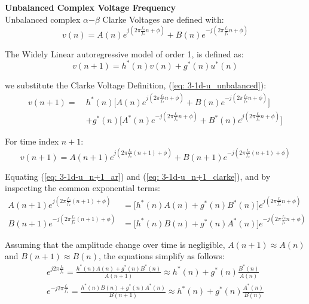 \documentclass[12pt]{article}
\numberwithin{equation}{section}
\begin{document}
			\noindent
			\textbf{Unbalanced Complex Voltage Frequency} \\
			Unbalanced complex $\alpha$$-$$\beta$ Clarke Voltages are defined with:
			\vspace*{-0.5\baselineskip}
			\begin{equation}
			v(n) = A(n) e^{j(2\pi \frac{f_{o}}{f_{s}} n + \phi)} + B(n) e^{-j(2\pi \frac{f_{o}}{f_{s}} n + \phi)}
			\label{eq: 3-1d-u_unbalanced}
			\end{equation}
			
			The Widely Linear autoregressive model of order 1, is defined as:
			\vspace*{-0.5\baselineskip}
			\begin{equation}
			v(n+1) = h^{*}(n) v(n) + g^{*}(n) u^{*}(n)
			\end{equation}
			
			we substitute the Clarke Voltage Definition, (\ref{eq: 3-1d-u_unbalanced}):
			\vspace*{-0.8\baselineskip}
			\begin{align}
			v(n+1) =\ 
			&h^{*}(n) \bigg[ A(n) e^{j(2\pi \frac{f_{o}}{f_{s}} n + \phi)} + B(n) e^{-j(2\pi \frac{f_{o}}{f_{s}} n + \phi)} \bigg] \nonumber\\
			&+ g^{*}(n) \bigg[ A^{*}(n) e^{-j(2\pi \frac{f_{o}}{f_{s}} n + \phi)} + B^{*}(n) e^{j(2\pi \frac{f_{o}}{f_{s}} n + \phi)} \bigg]
			\label{eq: 3-1d-u_n+1_ar}
			\end{align}
			
			For time index $n+1$:
			\begin{equation}
			v(n+1) = A(n+1) e^{j(2\pi \frac{f_{o}}{f_{s}} (n+1) + \phi)} + B(n+1) e^{-j(2\pi \frac{f_{o}}{f_{s}} (n+1) + \phi)}
			\label{eq: 3-1d-u_n+1_clarke}
			\end{equation}
			
			Equating (\ref{eq: 3-1d-u_n+1_ar}) and (\ref{eq: 3-1d-u_n+1_clarke}), and by inspecting the common exponential terms:
			\begin{align}
			A(n+1) e^{j(2\pi \frac{f_{o}}{f_{s}} (n+1) + \phi)} &= \bigg[ h^{*}(n) A(n) + g^{*}(n) B^{*}(n) \bigg] e^{j(2\pi \frac{f_{o}}{f_{s}} n + \phi)} \\
			B(n+1) e^{-j(2\pi \frac{f_{o}}{f_{s}} (n+1) + \phi)} &= \bigg[ h^{*}(n) B(n) + g^{*}(n) A^{*}(n) \bigg] e^{-j(2\pi \frac{f_{o}}{f_{s}} n + \phi)}
			\end{align}
			
			Assuming that the amplitude change over time is negligible, $A(n+1) \approx A(n)$ and $B(n+1) \approx B(n)$, the equations simplify as follows:
			\begin{align}
			e^{j 2\pi \frac{f_{o}}{f_{s}}} = \frac{h^{*}(n) A(n) + g^{*}(n) B^{*}(n)}{A(n+1)} \approx h^{*}(n) + g^{*}(n) \frac{B^{*}(n)}{A(n)} \label{eq: 3-1d-e_A}\\
			e^{-j 2\pi \frac{f_{o}}{f_{s}}} = \frac{h^{*}(n) B(n) + g^{*}(n) A^{*}(n)}{B(n+1)} \approx h^{*}(n) + g^{*}(n) \frac{A^{*}(n)}{B(n)} \label{eq: 3-1d-e_B}
			\end{align}
			
\end{document}
